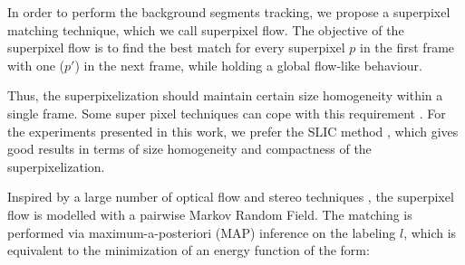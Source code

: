 \label{sec:suppix}


In order to perform the background segments tracking,  we propose a superpixel matching technique, 
which we call superpixel flow. The objective of the superpixel flow is to find the best match for every superpixel $p$ in the first 
frame with one ($p'$) in the next frame, while holding a global flow-like behaviour.

Thus, the superpixelization should maintain certain size homogeneity within a single frame. Some super
pixel techniques can cope with this requirement \cite{c9}\cite{c10}. For the experiments presented 
in this work, we prefer the SLIC method \cite{c9}, which gives
good results in terms of size homogeneity and compactness of the superpixelization. 


Inspired by a large number of optical flow and stereo techniques \cite{c7}\cite{c12}\cite{c13}, 
the superpixel flow is modelled with a pairwise Markov Random Field. The matching is performed via maximum-a-posteriori (MAP) inference on the labeling $l$, which is equivalent to the minimization of an energy function of the form:

